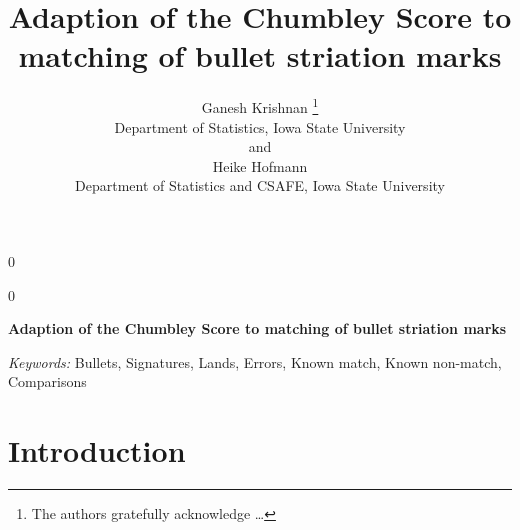 \documentclass[12pt]{article}
\newcommand{\blind}{0}
\begin{document}
\def\spacingset#1{\renewcommand{\baselinestretch}%
{#1}\small\normalsize} \spacingset{1}



\blind
{
  \title{\bf Adaption of the Chumbley Score to matching of bullet striation marks}

  \author{
        Ganesh Krishnan \thanks{The authors gratefully acknowledge \ldots{}} \\
    Department of Statistics, Iowa State University\\
     and \\     Heike Hofmann \\
    Department of Statistics and CSAFE, Iowa State University\\
      }
  \maketitle
} \fi

\blind
{
  \bigskip
  \bigskip
  \bigskip
  \begin{center}
    {\LARGE\bf Adaption of the Chumbley Score to matching of bullet striation marks}
  \end{center}
  \medskip
} \fi

\bigskip
% 

\noindent%
{\it Keywords:} Bullets, Signatures, Lands, Errors, Known match, Known non-match,
Comparisons
\vfill

\newpage
\spacingset{1.45} %

\newcommand{\hh}[1]{{\textcolor{orange}{#1}}}
\newcommand{\gk}[1]{{\textcolor{green}{#1}}}
\newcommand{\cited}[1]{{\textcolor{red}{#1}}}

\section{Introduction}\label{introduction}
\end{document}
